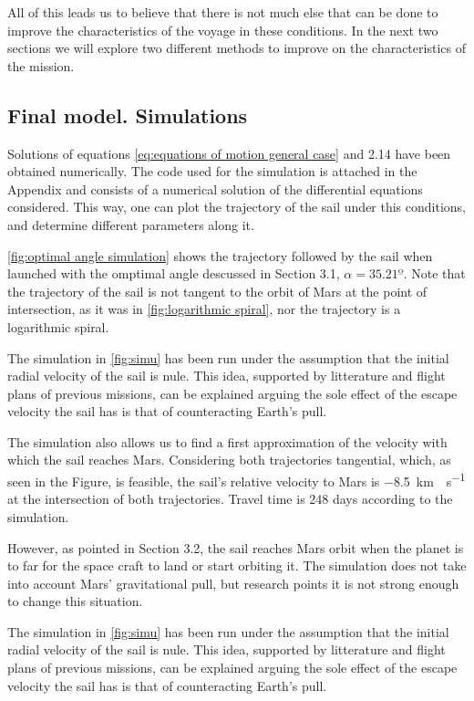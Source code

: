 \documentclass[twocolumn,12pt,a4paper]{article}
\numberwithin{equation}{section}
\begin{document}
All of this leads us to believe that there is not much else that can be done to improve the characteristics of the voyage in these conditions. In the next two sections we will explore two different methods to improve on the characteristics of the mission.

\subsection{Final model. Simulations}
Solutions of equations \ref{eq:equations of motion general case} and 2.14 have been obtained numerically. The code used for the simulation is attached in the Appendix and consists of a numerical solution of the differential equations considered. This way, one can plot the trajectory of the sail under this conditions, and determine different parameters along it.

 \autoref{fig:optimal angle simulation} shows the trajectory followed by the sail when launched with the omptimal angle descussed in Section 3.1, $\alpha=35.21º$. Note that the trajectory of the sail is not tangent to the orbit of Mars at the point of intersection, as it was in \autoref{fig:logarithmic spiral}, nor the trajectory is a logarithmic spiral.

The simulation in  \autoref{fig:simu} has been run under the assumption that the initial radial velocity of the sail is nule. This idea, supported by litterature and flight plans of previous missions, can be explained arguing the sole effect of the escape velocity the sail has is that of counteracting Earth's pull.

The simulation also allows us to find a first approximation of the velocity with which the sail reaches Mars. Considering both trajectories tangential, which, as seen in the Figure, is feasible, the sail's relative velocity to Mars is \SI{-8,5}{km\cdot s^{-1}} at the intersection of both trajectories. Travel time is 248 days according to the simulation.

However, as pointed in Section 3.2, the sail reaches Mars orbit when the planet is to far for the space craft to land or start orbiting it. The simulation does not take into account Mars' gravitational pull, but research points it is not strong enough to change this situation.

 
The simulation in  \autoref{fig:simu} has been run under the assumption that the initial radial velocity of the sail is nule. This idea, supported by litterature and flight plans of previous missions, can be explained arguing the sole effect of the escape velocity the sail has is that of counteracting Earth's pull.
\end{document}
